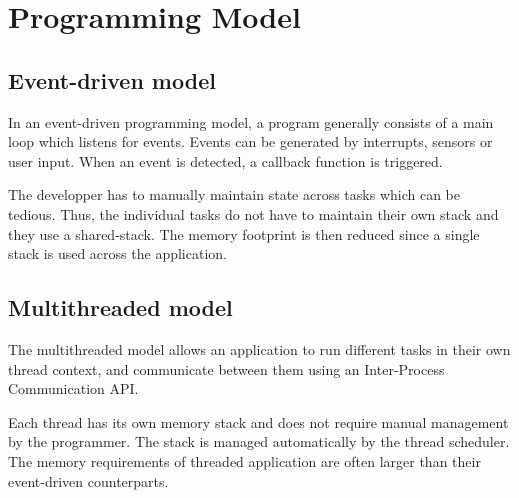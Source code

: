\section{Programming Model}

\subsection{Event-driven model}
In an event-driven programming model, a program generally consists of a main loop which listens for events.
Events can be generated by interrupts, sensors or user input.
When an event is detected, a callback function is triggered.

The developper has to manually maintain state across tasks which can be tedious.
Thus, the individual tasks do not have to maintain their own stack and they use a shared-stack.
The memory footprint is then reduced since a single stack is used across the application.

\subsection{Multithreaded model}
The multithreaded model allows an application to run different tasks in their own thread context,
    and communicate between them using an Inter-Process Communication API.

Each thread has its own memory stack and does not require manual management by the programmer.
The stack is managed automatically by the thread scheduler.
The memory requirements of threaded application are often larger than their event-driven counterparts.